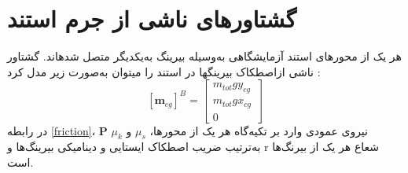 \section{گشتاورهای ناشی از جرم استند}

هر یک از محورهای استند آزمایشگاهی به‌وسیله بیرینگ به‌یکدیگر متصل شدهاند. گشتاور ناشی ازاصطکاک بیرینگها در استند را میتوان به‌صورت زیر مدل کرد
\cite{Arabolye}
:
\begin{equation}\label{friction}
	[\boldsymbol m_ {cg}]^B = \begin{bmatrix}
		m_{tot}gy_{cg} \\
		m_{tot}gx_{cg} \\
		0
	\end{bmatrix}
\end{equation}
در رابطه \ref{friction}، $\boldsymbol P$ نیروی عمودی وارد بر تکیه‌گاه هر یک از محورها، $\mu_s$ و $\mu_k$ به‌ترتیب ضریب اصطکاک
ایستایی و دینامیکی بیرینگ‌ها و r شعاع هر یک از بیرنگ‌ها است.
